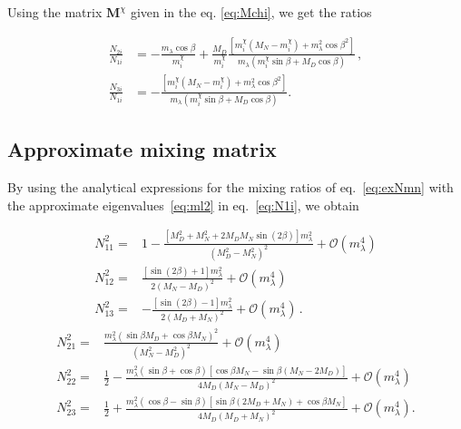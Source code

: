 Using the matrix $\textbf{M}^{\chi}$ given in the eq. \eqref{eq:Mchi}, we get the ratios

\begin{align}
\label{eq:exNmn}
\frac{{N}_{2i}}{{N}_{1i}}
&=-\frac{m_{\lambda} \cos\beta}{m_i^\chi}+\frac{M_D}{m_i^\chi}\frac{[m_i^\chi(M_N-m_i^\chi)+m_{\lambda}^2\cos\beta^2 ]}{m_{\lambda}(m_i^\chi\sin\beta +M_D\cos\beta )}\,, \nonumber\\  
\frac{{N}_{3i}}{{N}_{1i}}
&=-\frac{[m_i^\chi(M_N-m_i^\chi)+m_{\lambda}^2 \cos\beta^2]}{m_{\lambda} (m_i^\chi\sin\beta+M_D\cos\beta)}.
\end{align}


\subsection{Approximate mixing matrix}
By using the analytical expressions for the mixing ratios of
eq.~\eqref{eq:exNmn} with the approximate eigenvalues~\eqref{eq:ml2}
in eq.~\eqref{eq:N1i}, we obtain

\begin{align}
N_{11}^2=& 1-\frac{\left[M_D^2+M_N^2+2M_DM_N\sin(2\beta)\right]m^2_{\lambda}}{(M_D^2-M_N^2)^2}+\mathcal{O}\left( m_{\lambda}^4 \right)\nonumber\\
N_{12}^2 =&   \frac{[\sin (2 \beta )+1] m_{\lambda }^2}{2 \left(M_N-M_D\right)^2}+\mathcal{O}\left( m_{\lambda}^4 \right)\nonumber\\
N_{13}^2=&  -\frac{[\sin (2 \beta )-1] m_{\lambda }^2}{2 \left(M_D+M_N\right)^2}+\mathcal{O}\left( m_{\lambda}^4 \right)\,.
\end{align}
\begin{align}
N_{21}^2=&\frac{m_{\lambda }^2 \left(\sin\beta  M_D+\cos\beta
   M_N\right)^2}{\left(M_N^2-M_D^2\right)^2}+\mathcal{O}\left( m_{\lambda}^4 \right)\nonumber\\
N_{22}^2=&\frac{1}{2}-\frac{m_{\lambda }^2 (\sin\beta+\cos\beta) \left[\cos\beta M_N-\sin\beta  \left(M_N-2 M_D\right)\right]}{4 M_D \left(M_N-M_D\right)^2}+\mathcal{O}\left( m_{\lambda}^4 \right)\nonumber\\
   N_{23}^2=&\frac{1}{2}+\frac{m_{\lambda }^2 (\cos\beta-\sin\beta) \left[\sin\beta \left(2
   M_D+M_N\right)+\cos\beta M_N\right]}{4 M_D \left(M_D+M_N\right)^2}+\mathcal{O}\left( m_{\lambda}^4 \right).
\end{align}

